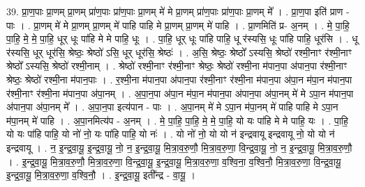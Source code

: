 \documentclass[17pt]{extarticle}
\begin{document}
39. प्रा॒ण॒पाः प्रा॒णम् प्रा॒णम् प्रा॑ण॒पाः प्रा॑ण॒पाः प्रा॒णम् मे॑ मे प्रा॒णम् प्रा॑ण॒पाः प्रा॑ण॒पाः प्रा॒णम् मे᳚ । . प्रा॒ण॒पा इति॑ प्राण - पाः । . प्रा॒णम् मे॑ मे प्रा॒णम् प्रा॒णम् मे॑ पाहि पाहि मे प्रा॒णम् प्रा॒णम् मे॑ पाहि । . प्रा॒णमिति॑ प्र- अ॒नम् । . मे॒ पा॒हि॒ पा॒हि॒ मे॒ मे॒ पा॒हि॒ धूर् धूः पा॑हि मे मे पाहि॒ धूः । . पा॒हि॒ धूर् धूः पा॑हि पाहि॒ धू र॑स्यसि॒ धूः पा॑हि पाहि॒ धूर॑सि । . धू र॑स्यसि॒ धूर् धूर॑सि॒ श्रेष्ठः॒ श्रेष्ठो॑ ऽसि॒ धूर् धूर॑सि॒ श्रेष्ठः॑ । . अ॒सि॒ श्रेष्ठः॒ श्रेष्ठो᳚ ऽस्यसि॒ श्रेष्ठो॑ रश्मी॒नाꣳ र॑श्मी॒नाꣳ श्रेष्ठो᳚ ऽस्यसि॒ श्रेष्ठो॑ रश्मी॒नाम् । . श्रेष्ठो॑ रश्मी॒नाꣳ र॑श्मी॒नाꣳ श्रेष्ठः॒ श्रेष्ठो॑ रश्मी॒ना म॑पान॒पा अ॑पान॒पा र॑श्मी॒नाꣳ श्रेष्ठः॒ श्रेष्ठो॑ रश्मी॒ना म॑पान॒पाः । . र॒श्मी॒ना म॑पान॒पा अ॑पान॒पा र॑श्मी॒नाꣳ र॑श्मी॒ना म॑पान॒पा अ॑पा॒न म॑पा॒न म॑पान॒पा र॑श्मी॒नाꣳ र॑श्मी॒ना म॑पान॒पा अ॑पा॒नम् । . अ॒पा॒न॒पा अ॑पा॒न म॑पा॒न म॑पान॒पा अ॑पान॒पा अ॑पा॒नम् मे॑ मे ऽपा॒न म॑पान॒पा अ॑पान॒पा अ॑पा॒नम् मे᳚ । . अ॒पा॒न॒पा इत्य॑पान - पाः । . अ॒पा॒नम् मे॑ मे ऽपा॒न म॑पा॒नम् मे॑ पाहि पाहि मे ऽपा॒न म॑पा॒नम् मे॑ पाहि । . अ॒पा॒नमित्य॑प - अ॒नम् । . मे॒ पा॒हि॒ पा॒हि॒ मे॒ मे॒ पा॒हि॒ यो यः पा॑हि मे मे पाहि॒ यः । . पा॒हि॒ यो यः पा॑हि पाहि॒ यो नो॑ नो॒ यः पा॑हि पाहि॒ यो नः॑ । . यो नो॑ नो॒ यो यो न॑ इन्द्रवायू इन्द्रवायू नो॒ यो यो न॑ इन्द्रवायू । . न॒ इ॒न्द्र॒वा॒यू॒ इ॒न्द्र॒वा॒यू॒ नो॒ न॒ इ॒न्द्र॒वा॒यू॒ मि॒त्रा॒व॒रु॒णौ॒ मि॒त्रा॒व॒रु॒णा॒ वि॒न्द्र॒वा॒यू॒ नो॒ न॒ इ॒न्द्र॒वा॒यू॒ मि॒त्रा॒व॒रु॒णौ॒ । . इ॒न्द्र॒वा॒यू॒ मि॒त्रा॒व॒रु॒णौ॒ मि॒त्रा॒व॒रु॒णा॒ वि॒न्द्र॒वा॒॒यू॒ इ॒न्द्र॒वा॒यू॒ मि॒त्रा॒व॒रु॒णा॒ व॒श्वि॒ना॒ व॒श्वि॒नौ॒ मि॒त्रा॒व॒रु॒णा॒ वि॒न्द्र॒वा॒यू॒ इ॒न्द्र॒वा॒यू॒ मि॒त्रा॒व॒रु॒णा॒ व॒श्वि॒नौ॒ । . इ॒न्द्र॒वा॒यू॒ इती᳚न्द्र - वा॒यू॒ । \newline
\end{document}
